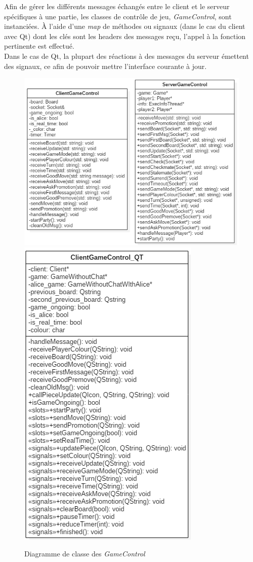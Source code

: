 \documentclass[10pt, a4paper]{article}
\begin{document}
Afin de gérer les différents messages échangés entre le client et le serveur spécifiques à une partie, les classes de contrôle de jeu, \textit{GameControl}, sont instanciées. À l'aide d'une \textit{map} de méthodes ou signaux (dans le cas du client avec Qt) dont les clés sont les headers des messages reçu, l'appel à la fonction pertinente est effectué.\\
Dans le cas de Qt, la plupart des réactions à des messages du serveur émettent des signaux, ce afin de pouvoir mettre l'interface courante à jour.\\

\begin{figure}[H]
\centering
\includegraphics[scale=0.72]{client_server_control.png}
\includegraphics[scale=0.72]{diagram_clientgamecontrolqt.png}
\caption{Diagramme de classe des \textit{GameControl}}
\end{figure}
\end{document}
